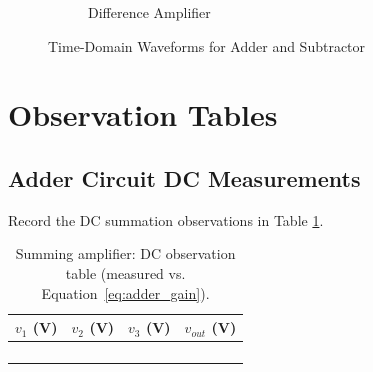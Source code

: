 \begin{figure}[h!]
\begin{subfigure}[b]{0.42\textwidth}
		\caption{Difference Amplifier}
		\label{fig:waveforms_sub}
	\end{subfigure}
	\caption{Time-Domain Waveforms for Adder and Subtractor}
	\label{fig:waveforms_adder_sub}
\end{figure}

\section{Observation Tables}

\subsection{Adder Circuit DC Measurements}
Record the DC summation observations in Table \ref{tab:dc_adder}.

\begin{table}[h!]
	\centering
	\begin{tabular}{@{}cccc@{}}
		\toprule
		$v_1$ (V) & $v_2$ (V) & $v_3$ (V) & $v_{out}$ (V) \\
		\midrule
		&  &  &  \\
		&  &  &  \\
		&  &  &  \\
		&  &  &  \\
		\bottomrule
	\end{tabular}
	\caption{Summing amplifier: DC observation table (measured vs. Equation~\eqref{eq:adder_gain}).}
	\label{tab:dc_adder}
\end{table}


